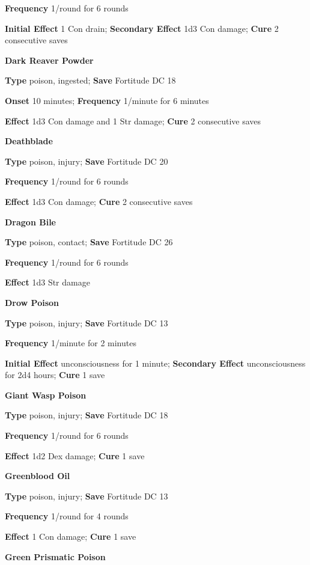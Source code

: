 \textbf{Frequency} 1/round for 6 rounds
				
\textbf{Initial Effect }1 Con drain; \textbf{Secondary Effect} 1d3 Con damage;\textbf{ Cure} 2 consecutive saves
				
\textbf{Dark Reaver Powder }
				
\textbf{Type} poison, ingested; \textbf{Save} Fortitude DC 18 
				
\textbf{Onset }10 minutes; \textbf{Frequency} 1/minute for 6 minutes
				
\textbf{Effect }1d3 Con damage and 1 Str damage;\textbf{ Cure} 2 consecutive saves
				
\textbf{Deathblade }
				
\textbf{Type} poison, injury; \textbf{Save} Fortitude DC 20 
				
\textbf{Frequency} 1/round for 6 rounds
				
\textbf{Effect }1d3 Con damage;\textbf{ Cure} 2 consecutive saves
				
\textbf{Dragon Bile }
				
\textbf{Type} poison, contact; \textbf{Save} Fortitude DC 26 
				
\textbf{Frequency} 1/round for 6 rounds
				
\textbf{Effect }1d3 Str damage
				
\textbf{Drow Poison }
				
\textbf{Type} poison, injury; \textbf{Save} Fortitude DC 13 
				
\textbf{Frequency} 1/minute for 2 minutes
				
\textbf{Initial Effect }unconsciousness for 1 minute; \textbf{Secondary Effect }unconsciousness for 2d4 hours;\textbf{ Cure} 1 save
				
\textbf{Giant Wasp Poison }
				
\textbf{Type} poison, injury; \textbf{Save} Fortitude DC 18 
				
\textbf{Frequency} 1/round for 6 rounds
				
\textbf{Effect }1d2 Dex damage;\textbf{ Cure} 1 save
				
\textbf{Greenblood Oil }
				
\textbf{Type} poison, injury; \textbf{Save} Fortitude DC 13 
				
\textbf{Frequency} 1/round for 4 rounds
				
\textbf{Effect }1 Con damage;\textbf{ Cure} 1 save
				
\textbf{Green Prismatic Poison}
				
